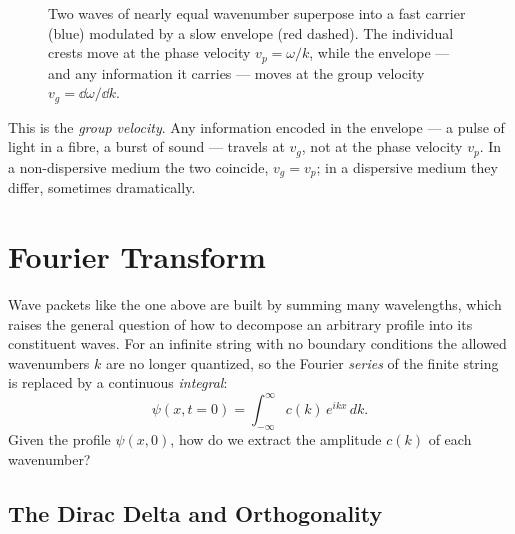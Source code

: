 \begin{figure}[H]
\centering
{}
\caption{Two waves of nearly equal wavenumber superpose into a fast carrier (blue) modulated by a slow envelope (red dashed). The individual crests move at the phase velocity $v_p = \omega/k$, while the envelope --- and any information it carries --- moves at the group velocity $v_g = \dd\omega/\dd k$.}
\label{fig:beats}
\end{figure}

This is the \emph{group velocity}. Any information encoded in the envelope --- a pulse of light in a fibre, a burst of sound --- travels at $v_g$, not at the phase velocity $v_p$. In a non-dispersive medium the two coincide, $v_g = v_p$; in a dispersive medium they differ, sometimes dramatically.

\section{Fourier Transform}

Wave packets like the one above are built by summing many wavelengths, which raises the general question of how to decompose an arbitrary profile into its constituent waves. For an infinite string with no boundary conditions the allowed wavenumbers $k$ are no longer quantized, so the Fourier \emph{series} of the finite string is replaced by a continuous \emph{integral}:
\begin{equation}
    \psi(x, t=0) = \int_{-\infty}^{\infty} c(k)\, e^{ikx}\, dk.
\end{equation}
Given the profile $\psi(x,0)$, how do we extract the amplitude $c(k)$ of each wavenumber?

\subsection{The Dirac Delta and Orthogonality}

